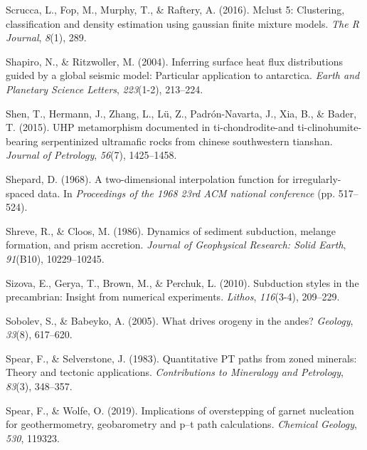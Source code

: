 \begin{CSLReferences}{1}{1}
\leavevmode{}%
Scrucca, L., Fop, M., Murphy, T., \& Raftery, A. (2016). Mclust 5: Clustering, classification and density estimation using gaussian finite mixture models. \emph{The R Journal}, \emph{8}(1), 289.

\leavevmode{}%
Shapiro, N., \& Ritzwoller, M. (2004). Inferring surface heat flux distributions guided by a global seismic model: Particular application to antarctica. \emph{Earth and Planetary Science Letters}, \emph{223}(1-2), 213--224.

\leavevmode{}%
Shen, T., Hermann, J., Zhang, L., Lü, Z., Padrón-Navarta, J., Xia, B., \& Bader, T. (2015). UHP metamorphism documented in ti-chondrodite-and ti-clinohumite-bearing serpentinized ultramafic rocks from chinese southwestern tianshan. \emph{Journal of Petrology}, \emph{56}(7), 1425--1458.

\leavevmode{}%
Shepard, D. (1968). A two-dimensional interpolation function for irregularly-spaced data. In \emph{Proceedings of the 1968 23rd ACM national conference} (pp. 517--524).

\leavevmode{}%
Shreve, R., \& Cloos, M. (1986). Dynamics of sediment subduction, melange formation, and prism accretion. \emph{Journal of Geophysical Research: Solid Earth}, \emph{91}(B10), 10229--10245.

\leavevmode{}%
Sizova, E., Gerya, T., Brown, M., \& Perchuk, L. (2010). Subduction styles in the precambrian: Insight from numerical experiments. \emph{Lithos}, \emph{116}(3-4), 209--229.

\leavevmode{}%
Sobolev, S., \& Babeyko, A. (2005). What drives orogeny in the andes? \emph{Geology}, \emph{33}(8), 617--620.

\leavevmode{}%
Spear, F., \& Selverstone, J. (1983). Quantitative PT paths from zoned minerals: Theory and tectonic applications. \emph{Contributions to Mineralogy and Petrology}, \emph{83}(3), 348--357.

\leavevmode{}%
Spear, F., \& Wolfe, O. (2019). Implications of overstepping of garnet nucleation for geothermometry, geobarometry and p--t path calculations. \emph{Chemical Geology}, \emph{530}, 119323.


\end{CSLReferences}

